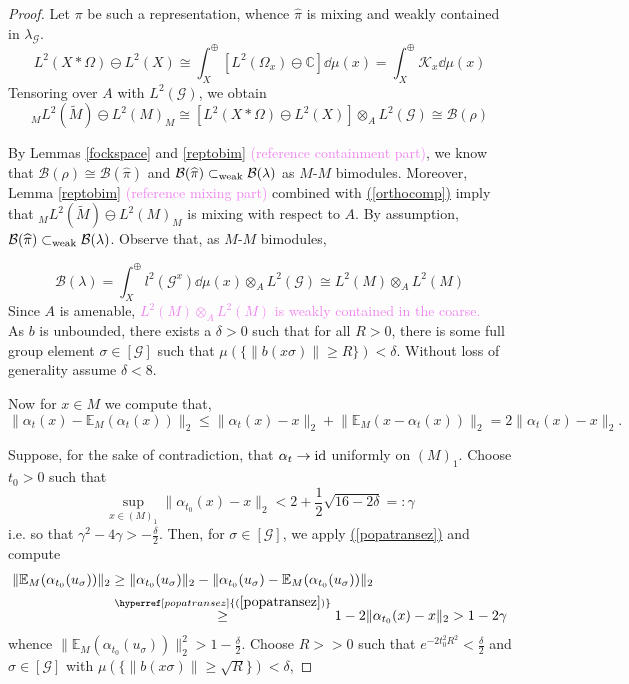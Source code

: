 \documentclass[a4paper,11pt]{article}
\renewcommand{\eqref}[1]{\hyperref[#1]{(\ref{#1})}}
\numberwithin{equation}{section}
\theoremstyle{definition}
\theoremstyle{remark}
\numberwithin{equation}{section}
\newcommand{\rG}{\mathcal{G}}
\newcommand{\B}{\mathcal{B}}
\newcommand{\C}{\mathbb{C}}
\newcommand{\E}{\mathbb{E}}
\def\K{\mathcal K}
\newcommand{\subwk}{\subset_{\rm{weak}}}
\providecommand{\norm}[1]{\lVert#1\rVert}
\numberwithin{equation}{section}
\begin{document}
\begin{proof}
   Let $\pi$ be such a representation, whence $\widehat{\pi}$ is mixing and weakly contained in $\lambda_\rG$. 
    \[
        L^2(X\ast \Omega) \ominus L^2(X) \cong \int_X^\oplus [L^2(\Omega_x) \ominus \C] \dd{\mu(x)} = \int_X^\oplus \K_x \dd{\mu(x)} 
    \]
    Tensoring over $A$ with $L^2(\rG)$, we obtain
    \begin{equation}\label{orthocomp}
        _M L^2(\widetilde{M}) \ominus L^2(M)_M \cong [L^2(X\ast \Omega) \ominus L^2(X)]\otimes_A L^2(\rG) \cong \B(\rho)
    \end{equation}

    By Lemmas \ref{fockspace} and \ref{reptobim} \textcolor{violet}{(reference containment part)}, we know that $\B(\rho) \cong \B(\widehat{\pi})$ and $\B(\widehat{\pi}) \subwk \B(\lambda)$ as $M$-$M$ bimodules. Moreover, Lemma \ref{reptobim} \textcolor{violet}{(reference mixing part)} combined with \eqref{orthocomp} imply that $_M L^2(\widetilde{M}) \ominus L^2(M)_M$ is mixing with respect to $A$. By assumption, $\B(\widehat{\pi})\subwk \B(\lambda)$. Observe that, as $M$-$M$ bimodules, 

    \[
        \B(\lambda) = \int_X^{\oplus} l^2(\rG^x) \dd{\mu(x)} \otimes_A L^2(\rG) \cong L^2(M) \otimes_A L^2(M)
    \]
    Since $A$ is amenable, \textcolor{violet}{$L^2(M)\otimes_A L^2(M)$ is weakly contained in the coarse.}\\


    As $ b $ is unbounded, there exists a $ \delta>0 $ such that for all $ R>0 $, there is some full group element $ \sigma\in [\rG] $ such that $ \mu(\{\norm{b(x \sigma)}\geq R\}) <\delta $. Without loss of generality assume $ \delta < 8 $.

    Now for $ x\in M $ we compute that,
    \begin{equation}\label{popatransez}
        \norm{\alpha_{t}(x) - \E_{M}(\alpha_{t}(x))}_{2} \leq \norm{\alpha_{t}(x) - x}_{2} + \norm{\E_{M}(x - \alpha_{t}(x))}_{2} = 2 \norm{\alpha_{t}(x) - x}_{2}.
    \end{equation}

    Suppose, for the sake of contradiction, that $ \alpha_{t}\to {\rm id }$ uniformly on $ (M)_{1} $. Choose $ t_{0} > 0 $ such that
    \[
        \sup_{x\in (M)_{1}} \norm{\alpha_{t_{0}}(x) - x}_{2} < 2+ \frac{1}{2}\sqrt{16-2\delta} =: \gamma
    \]
    i.e. so that $ \gamma^{2}-4\gamma > -\frac{\delta}{2} $. Then, for $ \sigma\in [\rG] $, we apply \eqref{popatransez} and compute
    \begin{align*}
        \norm{\E_{M}(\alpha_{t_{0}}(u_{\sigma}))}_{2} &\geq \norm{\alpha_{t_0}(u_{\sigma})}_{2} -\norm{\alpha_{t_0}(u_{\sigma}) - \E_{M}(\alpha_{t_0}(u_{\sigma}))}_{2}\\
        & \overset{\eqref{popatransez}}{\geq} 1 - 2\norm{\alpha_{t_0}(x) - x}_{2} > 1-2\gamma
    \end{align*}
    whence $  \norm{\E_{M}(\alpha_{t_{0}}(u_{\sigma}))}_{2}^{2} > 1-\frac{\delta}{2} $. Choose $ R>>0 $ such that $ e^{-2t_{0}^{2}R^2} < \frac{\delta}{2} $ and $ \sigma\in [\rG] $ with $ \mu(\{\norm{b(x \sigma)}\geq \sqrt{R}\}) < \delta $,


\end{proof}
\end{document}

